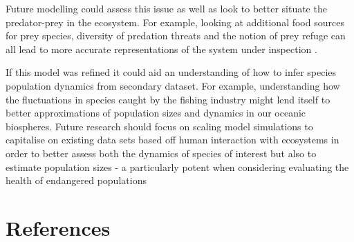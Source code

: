 \documentclass{article}
\begin{document}
Future modelling could assess this issue as well as look to better situate the predator-prey in the ecosystem. For example, looking  at additional food sources for prey species, diversity of predation threats and the notion of prey refuge can all lead to more accurate representations of the system under inspection \parencite{chakraborty_interactive_2017, tyson_modelling_2010,lin_spreading_2011, sih_prey_1987}. 

If this model was refined it could aid an understanding of how to infer species population dynamics from secondary dataset. For example, understanding how the fluctuations in species caught by the fishing industry might lend itself to better approximations of population sizes and dynamics in our oceanic biospheres. Future research should focus on scaling model simulations to capitalise on existing data sets based off human interaction with ecosystems in order to better assess both the dynamics of species of interest but also to estimate population sizes - a particularly potent when considering evaluating the health of endangered populations
\clearpage
\section{References}
\printbibliography
\end{document}
